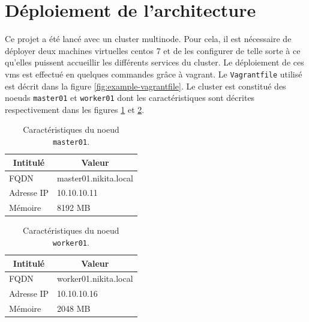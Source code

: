 \documentclass[12pt, french]{report}
\begin{document}
\section{Déploiement de l'architecture}

Ce projet a été lancé avec un cluster multinode. Pour cela, il est nécessaire de déployer deux machines virtuelles \gls{centos} 7 et de les configurer de telle sorte à ce qu'elles puissent accueillir les différents services du cluster. Le déploiement de ces vms est effectué en quelques commandes grâce à \gls{vagrant}. Le \texttt{Vagrantfile} utilisé est décrit dans la figure \ref{fig:example-vagrantfile}. Le cluster est constitué des noeuds \texttt{master01} et \texttt{worker01} dont les caractéristiques sont décrites respectivement dans les figures \ref{tab:caractéristiques-cluster-master01} et \ref{tab:caractéristiques-cluster-worker01}.

\begin{table}[h]
\centering
\begin{tabular}{|l|l|}
\hline
\multicolumn{1}{|c|}{\textbf{Intitulé}} & \multicolumn{1}{c|}{\textbf{Valeur}}         \\ \hline
FQDN                                      & master01.nikita.local                      \\ \hline
Adresse IP                                & 10.10.10.11                                \\ \hline
Mémoire                                   & 8192 MB                                    \\ \hline
\end{tabular}
\caption{Caractéristiques du noeud \texttt{master01}.}
\label{tab:caractéristiques-cluster-master01}
\end{table}

\begin{table}[h]
\centering
\begin{tabular}{|l|l|}
\hline
\multicolumn{1}{|c|}{\textbf{Intitulé}} & \multicolumn{1}{c|}{\textbf{Valeur}}         \\ \hline
FQDN                                      & worker01.nikita.local                      \\ \hline
Adresse IP                                & 10.10.10.16                                \\ \hline
Mémoire                                   & 2048 MB                                    \\ \hline
\end{tabular}
\caption{Caractéristiques du noeud \texttt{worker01}.}
\label{tab:caractéristiques-cluster-worker01}
\end{table}
\end{document}
